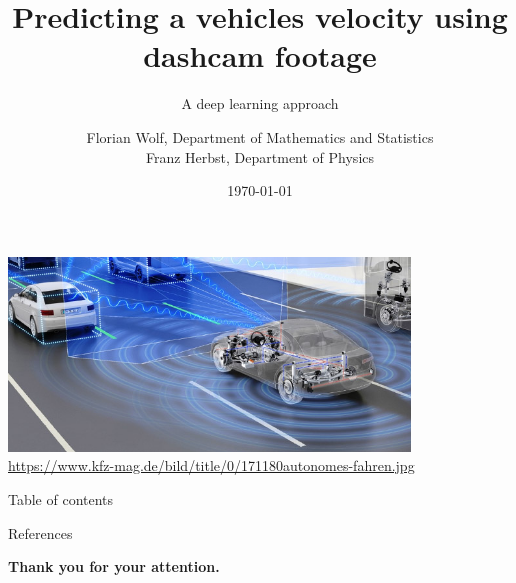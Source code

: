\documentclass[handout, 10pt, aspectratio=43]{beamer}
\title{Predicting a vehicles velocity using dashcam footage} %
\subtitle{A deep learning approach}
\author[Florian Wolf, Franz Herbst]{Florian Wolf, Department of Mathematics and Statistics\\Franz Herbst, Department of Physics}
\institute[Universität Konstanz]{
    Machine Learning using  Matlab\\%
    Universität Konstanz
} %
\date{\today}
\begin{document}
	
	\begin{frame}
		\begin{center}
			\includegraphics[width=0.8\textwidth]{imgs/171180autonomes-fahren.jpg}
			\tiny{\url{https://www.kfz-mag.de/bild/title/0/171180autonomes-fahren.jpg}}
		\end{center}
	\end{frame}
	
    \RaggedRight
    \frame{\titlepage}
    
    \begin{frame}{Table of contents}
        \tableofcontents
    \end{frame}
    
    
    
    
    
    
	
	
    \begin{frame}{References} %
    	\nocite{*}
        \printbibliography
     \end{frame}
	\begin{frame}[plain]
		\begin{center}
		\textbf{\LARGE{Thank you for your attention.}}
		\end{center}
	\end{frame}
\end{document}
